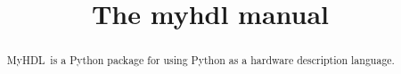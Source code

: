 \documentclass{manual}
\title{The myhdl manual}
\newcommand{\myhdl}{{MyHDL}}
\begin{document}
\maketitle



\begin{abstract}

\noindent
\myhdl\ is a Python package for using Python as a hardware description
language. 

\end{abstract}

\tableofcontents


\end{document}
